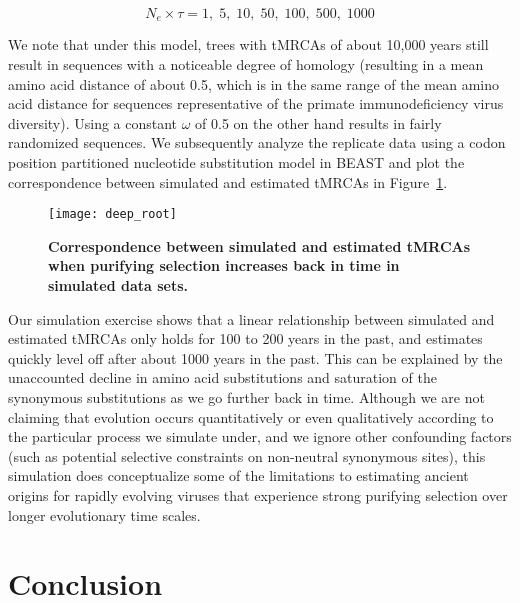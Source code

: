 \begin{equation}
N_{e} \times \tau=1,\; 5,\; 10,\; 50,\; 100,\; 500,\; 1000
\label{eq:gener_times}
\end{equation}

We note that under this model, trees with tMRCAs of about 10,000 years still result in sequences with a noticeable degree of homology (resulting in a mean amino acid distance of about 0.5, which is in the same range of the mean amino acid distance for sequences representative of the primate immunodeficiency virus diversity).
Using a constant $\omega$ of 0.5 on the other hand results in fairly randomized sequences.
We subsequently analyze the replicate data using a codon position partitioned nucleotide substitution model in BEAST and plot the correspondence between simulated and estimated tMRCAs in Figure~\ref{fig:deep_root}.

\begin{figure}[H]
\centering
\texttt{[image: deep\_root]} 
\caption{
{ \footnotesize
{\bf Correspondence between simulated and estimated tMRCAs when purifying selection increases back in time in simulated data sets.} 
}%
}
\label{fig:deep_root}
\end{figure}

Our simulation exercise shows that a linear relationship between simulated and estimated tMRCAs only holds for 100 to 200 years in the past, and estimates quickly level off after about 1000 years in the past.
This can be explained by the unaccounted decline in amino acid substitutions and saturation of the synonymous substitutions as we go further back in time.
Although we are not claiming that evolution occurs quantitatively or even qualitatively according to the particular process we simulate under, and we ignore other confounding factors (such as potential selective constraints on non-neutral synonymous sites), this simulation does conceptualize some of the limitations to estimating ancient origins for rapidly evolving viruses that experience strong purifying selection over longer evolutionary time scales.

\section{Conclusion}

